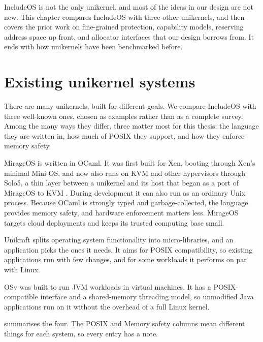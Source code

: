 \documentclass[12pt]{report}
\renewcommand{\_}{\origunderscore\allowbreak}
\begin{document}
IncludeOS is not the only unikernel, and most of the ideas in our design are not new. This chapter compares IncludeOS with three other unikernels, and then covers the prior work on fine-grained protection, capability models, reserving address space up front, and allocator interfaces that our design borrows from. It ends with how unikernels have been benchmarked before.

\section{Existing unikernel systems}
\label{sec:existing-unikernels}

There are many unikernels, built for different goals. We compare IncludeOS with three well-known ones, chosen as examples rather than as a complete survey. Among the many ways they differ, three matter most for this thesis: the language they are written in, how much of POSIX they support, and how they enforce memory safety.

MirageOS \cite{madhavapeddy2013unikernels} is written in OCaml. It was first built for Xen, booting through Xen's minimal Mini-OS, and now also runs on KVM and other hypervisors through Solo5, a thin layer between a unikernel and its host that began as a port of MirageOS to KVM \cite{solo5}. During development it can also run as an ordinary Unix process. Because OCaml is strongly typed and garbage-collected, the language provides memory safety, and hardware enforcement matters less. MirageOS targets cloud deployments and keeps its trusted computing base small.

Unikraft \cite{kuenzer2021unikraft} splits operating system functionality into micro-libraries, and an application picks the ones it needs. It aims for POSIX compatibility, so existing applications run with few changes, and for some workloads it performs on par with Linux.

OSv \cite{kivity2014osv} was built to run JVM workloads in virtual machines. It has a POSIX-compatible interface and a shared-memory threading model, so unmodified Java applications run on it without the overhead of a full Linux kernel.

 summarises the four. The POSIX and Memory safety columns mean different things for each system, so every entry has a note.
\end{document}

